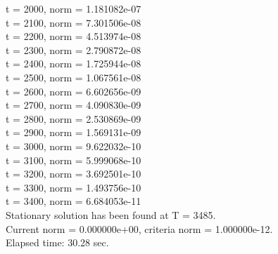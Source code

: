 \documentclass[12pt,a4paper]{article}
\begin{document}
\begin{center}
t = 2000, norm = 1.181082e-07                               \\
t = 2100, norm = 7.301506e-08                               \\
t = 2200, norm = 4.513974e-08                               \\
t = 2300, norm = 2.790872e-08                               \\
t = 2400, norm = 1.725944e-08                               \\
t = 2500, norm = 1.067561e-08                               \\
t = 2600, norm = 6.602656e-09                               \\
t = 2700, norm = 4.090830e-09                               \\
t = 2800, norm = 2.530869e-09                               \\
t = 2900, norm = 1.569131e-09                               \\
t = 3000, norm = 9.622032e-10                               \\
t = 3100, norm = 5.999068e-10                               \\
t = 3200, norm = 3.692501e-10                               \\
t = 3300, norm = 1.493756e-10                               \\
t = 3400, norm = 6.684053e-11                               \\
Stationary solution has been found at T = 3485.             \\
Current norm = 0.000000e+00, criteria norm = 1.000000e-12.  \\
Elapsed time: 30.28 sec.                                    \\
\end{center}
 
\end{document}
